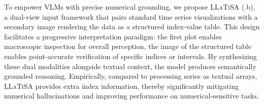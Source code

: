 \documentclass[11pt]{article}
\begin{document}
To empower VLMs with precise numerical grounding, we propose \textsc{LLaTiSA} (.b), a dual-view input framework that pairs standard time series visualizations with a secondary image rendering the data as a structured index-value table. This design facilitates a progressive interpretation paradigm: the first plot enables macroscopic inspection for overall perception, the image of the structured table enables point-accurate verification of specific indices or intervals. By synthesizing these dual modalities alongside textual context, the model produces semantically grounded reasoning. Empirically, compared to processing series as textual arrays, \textsc{LLaTiSA} provides extra index information, thereby significantly mitigating numerical hallucinations and improving performance on numerical-sensitive tasks.
\end{document}
